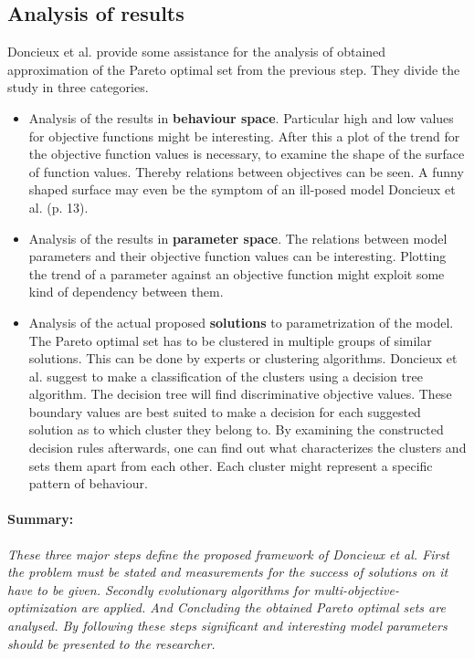 \documentclass[12pt,twoside]{article}
\theoremstyle{plain}
\theoremstyle{definition}
\theoremstyle{remark}
\begin{document}
\subsection{Analysis of results}
Doncieux et al. provide some assistance for the analysis of obtained approximation of the Pareto optimal set from the previous step. They divide the study in three categories.
\begin{itemize}
	\item Analysis of the results in \textbf{behaviour space}. Particular high and low values for objective functions might be interesting. After this a plot of the trend for the objective function values is necessary, to examine the shape of the surface of function values. Thereby relations between objectives can be seen. A funny shaped surface \glqq may even be the symptom of an ill-posed model\grqq{} Doncieux et al. \cite{doncieux2015multi} (p. 13).
	\item Analysis of the results in \textbf{parameter space}. The relations between model parameters and their objective function values can be interesting. Plotting the trend of a parameter against an objective function might exploit some kind of dependency between them.
	\item Analysis of the actual proposed \textbf{solutions} to parametrization of the model. The Pareto optimal set has to be clustered in multiple groups of similar solutions. This can be done by experts or clustering algorithms.
	Doncieux et al. suggest to make a classification of the clusters using a decision tree algorithm. The decision tree will find discriminative objective values. These boundary values are best suited to make a decision for each suggested solution as to which cluster they belong to.
	By examining the constructed decision rules afterwards, one can find out what characterizes the clusters and sets them apart from each other. Each cluster might represent a specific pattern of behaviour.
\end{itemize}

\paragraph{Summary:}
\textit{
	These three major steps define the proposed framework of Doncieux et al.
	First the problem must be stated and measurements for the success of solutions on it have to be given. Secondly evolutionary algorithms for multi-objective-optimization are applied. And Concluding the obtained Pareto optimal sets are analysed.
	By following these steps significant and interesting model parameters should be presented to the researcher.
}
\end{document}
